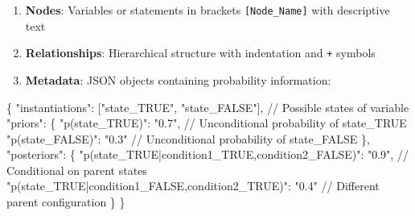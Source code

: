 \documentclass[
  11pt,
  letterpaper,
]{book}
\newenvironment{Shaded}{\begin{snugshade}}{\end{snugshade}}
\newcommand{\DataTypeTok}[1]{\textcolor[rgb]{0.68,0.00,0.00}{#1}}
\newcommand{\ErrorTok}[1]{\textcolor[rgb]{0.68,0.00,0.00}{#1}}
\newcommand{\FunctionTok}[1]{\textcolor[rgb]{0.28,0.35,0.67}{#1}}
\newcommand{\OtherTok}[1]{\textcolor[rgb]{0.00,0.23,0.31}{#1}}
\newcommand{\StringTok}[1]{\textcolor[rgb]{0.13,0.47,0.30}{#1}}
\providecommand{\tightlist}{%
  \setlength{\itemsep}{0pt}\setlength{\parskip}{0pt}}
\begin{document}
\begin{enumerate}
\def\labelenumi{\arabic{enumi}.}
\tightlist
\item
  \textbf{Nodes}: Variables or statements in brackets
  \texttt{{[}Node\_Name{]}} with descriptive text
\item
  \textbf{Relationships}: Hierarchical structure with indentation and
  \texttt{+} symbols
\item
  \textbf{Metadata}: JSON objects containing probability information:
\end{enumerate}

\begin{Shaded}
\begin{Highlighting}[]
\FunctionTok{\{}
  \DataTypeTok{"instantiations"}\FunctionTok{:} \OtherTok{[}\StringTok{"state\_TRUE"}\OtherTok{,} \StringTok{"state\_FALSE"}\OtherTok{]}\FunctionTok{,}  \ErrorTok{//} \ErrorTok{Possible} \ErrorTok{states} \ErrorTok{of} \ErrorTok{variable}
  \DataTypeTok{"priors"}\FunctionTok{:} \FunctionTok{\{}
    \DataTypeTok{"p(state\_TRUE)"}\FunctionTok{:} \StringTok{"0.7"}\FunctionTok{,}   \ErrorTok{//} \ErrorTok{Unconditional} \ErrorTok{probability} \ErrorTok{of} \ErrorTok{state\_TRUE}
    \DataTypeTok{"p(state\_FALSE)"}\FunctionTok{:} \StringTok{"0.3"}   \ErrorTok{//} \ErrorTok{Unconditional} \ErrorTok{probability} \ErrorTok{of} \ErrorTok{state\_FALSE}
  \FunctionTok{\},}
  \DataTypeTok{"posteriors"}\FunctionTok{:} \FunctionTok{\{}
    \DataTypeTok{"p(state\_TRUE|condition1\_TRUE,condition2\_FALSE)"}\FunctionTok{:} \StringTok{"0.9"}\FunctionTok{,}  \ErrorTok{//} \ErrorTok{Conditional} \ErrorTok{on} \ErrorTok{parent} \ErrorTok{states}
    \DataTypeTok{"p(state\_TRUE|condition1\_FALSE,condition2\_TRUE)"}\FunctionTok{:} \StringTok{"0.4"}   \ErrorTok{//} \ErrorTok{Different} \ErrorTok{parent} \ErrorTok{configuration}
  \FunctionTok{\}}
\FunctionTok{\}}


\end{Highlighting}
\end{Shaded}
\end{document}
